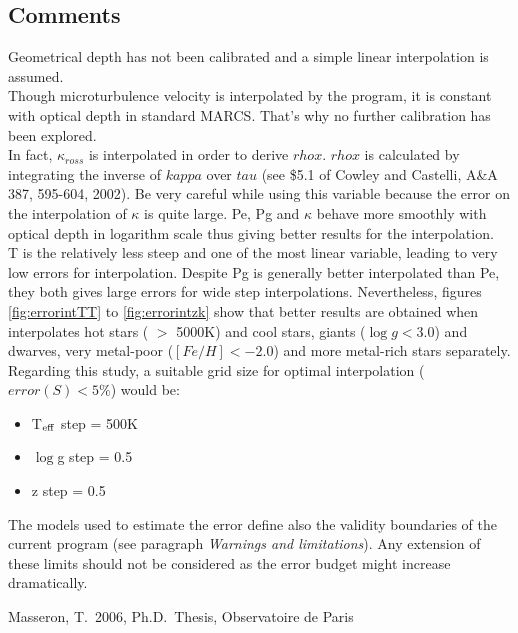 \documentclass[11pt]{article}
\begin{document}
\subsection{Comments}
Geometrical depth has not been calibrated and a simple linear interpolation is assumed. \\
Though microturbulence velocity is interpolated by the program, it is constant with optical depth in standard MARCS. That's why no further calibration has been explored.\\ 
In fact, $\kappa_{ross}$ is interpolated in order to derive $rhox$. $rhox$ is calculated by integrating the inverse of $kappa$ over $tau$ (see \$5.1 of Cowley and Castelli, A\&A 387, 595-604, 2002). Be very careful while using this variable because the error on the interpolation of $\kappa$ is quite large.
Pe, Pg and $\kappa$ behave more smoothly with optical depth in logarithm scale thus giving better results for the interpolation.\\ 
T is the relatively less steep and one of the most linear variable, leading to very low errors for interpolation. Despite Pg is generally better interpolated than Pe, they both gives large errors for wide step interpolations.
Nevertheless, figures  \ref{fig:errorintTT} to \ref{fig:errorintzk} show that better results are obtained when interpolates hot stars ( $>$ 5000K) and cool stars, giants ($\log g <3.0$) and dwarves, very metal-poor ($[Fe/H] <-2.0$) and more metal-rich stars separately. \\ 

Regarding this study, a suitable grid size for optimal interpolation ($error(S) < 5\%$) would be:
\begin{itemize}
\item T$\rm_{eff}$ step = 500K
\item $\log$g step = 0.5
\item z step = 0.5
\end{itemize}

The models used to estimate the error define also the validity boundaries of the current program (see paragraph \emph{Warnings and limitations}). Any extension of these limits should not be considered as the error budget might increase dramatically.      


\begin{thebibliography}{1}
 Masseron, T.\ 2006, Ph.D.~Thesis, Observatoire de Paris
\end{thebibliography}
\end{document}

